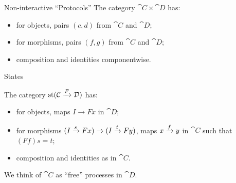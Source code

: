 \documentclass{beamer}
\newlength{\wideitemsep}
\let\olditem\item
\renewcommand{\item}{\setlength{\itemsep}{\wideitemsep}\olditem}
\begin{document}
\begin{frame}{Non-interactive ``Protocols''}
  The category $\cat{C}\times\cat{D}$ has:
  \begin{itemize}
    \item for objects, pairs $(c, d)$ from $\cat{C}$ and $\cat{D}$;
    \item for morphisms, pairs $(f, g)$ from $\cat{C}$ and $\cat{D}$;
    \item composition and identities componentwise.
  \end{itemize}
\end{frame}

\begin{frame}{States}
  \pause

  The category $\operatorname*{st}({\mathcal{C}}\xrightarrow{F}{\mathcal{D}})$ has:
  \begin{itemize}
    \item for objects, maps $I\to Fx$ in $\cat{D}$;
    \item for morphisms $(I\xrightarrow{s} Fx) \to (I\xrightarrow{t} Fy)$, maps $x\xrightarrow{f} y$ in
      $\cat{C}$ such that $(Ff) s = t$;
    \item composition and identities as in $\cat{C}$.
  \end{itemize}\pause

  We think of $\cat{C}$ as ``free'' processes in $\cat{D}$.
\end{frame}
\end{document}
